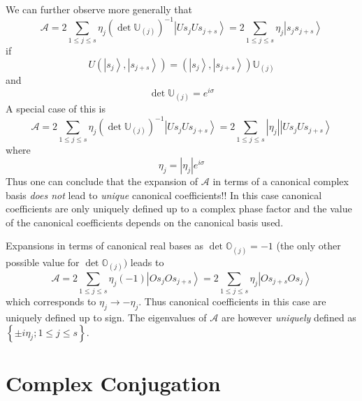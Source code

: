 \documentclass[aps,preprint]{revtex4}%
\begin{document}
We can further observe more generally that
\begin{equation}
\mathcal{A}=2\sum_{1\leq j\leq s}\eta_{j}\left(  \det\mathbb{U}_{\left(
j\right)  }\right)  ^{-1}\left\vert Us_{j}Us_{j+s}\right\rangle =2\sum_{1\leq
j\leq s}\eta_{j}\left\vert s_{j}s_{j+s}\right\rangle
\end{equation}
if
\begin{equation}
U\left(  \left\vert s_{j}\right\rangle ,\left\vert s_{j+s}\right\rangle
\right)  =\left(  \left\vert s_{j}\right\rangle ,\left\vert s_{j+s}%
\right\rangle \right)  \mathbb{U}_{\left(  j\right)  }%
\end{equation}
and
\begin{equation}
\det\mathbb{U}_{\left(  j\right)  }=e^{i\sigma}%
\end{equation}
A special case of this is
\begin{equation}
\mathcal{A}=2\sum_{1\leq j\leq s}\eta_{j}\left(  \det\mathbb{U}_{\left(
j\right)  }\right)  ^{-1}\left\vert Us_{j}Us_{j+s}\right\rangle =2\sum_{1\leq
j\leq s}\left\vert \eta_{j}\right\vert \left\vert Us_{j}Us_{j+s}\right\rangle
\end{equation}
where
\begin{equation}
\eta_{j}=\left\vert \eta_{j}\right\vert e^{i\sigma}%
\end{equation}
Thus one can conclude that the expansion of $\mathcal{A}$ in terms of a
canonical complex basis \emph{does not }lead to \emph{unique }canonical
coefficients!! In this case canonical coefficients are only uniquely defined
up to a complex phase factor and the value of the canonical coefficients
depends on the canonical basis used.

Expansions in terms of canonical real bases as $\det\mathbb{O}_{\left(
j\right)  }=-1$ (the only other possible value for $\det\mathbb{O}_{\left(
j\right)  })$ leads to%
\begin{equation}
\mathcal{A}=2\sum_{1\leq j\leq s}\eta_{j}\left(  -1\right)  \left\vert
Os_{j}Os_{j+s}\right\rangle =2\sum_{1\leq j\leq s}\eta_{j}\left\vert
Os_{j+s}Os_{j}\right\rangle
\end{equation}
which corresponds to $\eta_{j}\rightarrow-\eta_{j}$. Thus canonical
coefficients in this case are uniquely defined up to sign. The eigenvalues of
$\mathcal{A}$ are however \emph{uniquely} defined as $\left\{  \pm i\eta
_{j};1\leq j\leq s\right\}  $.

\section{Complex Conjugation\label{star}}
\end{document}
